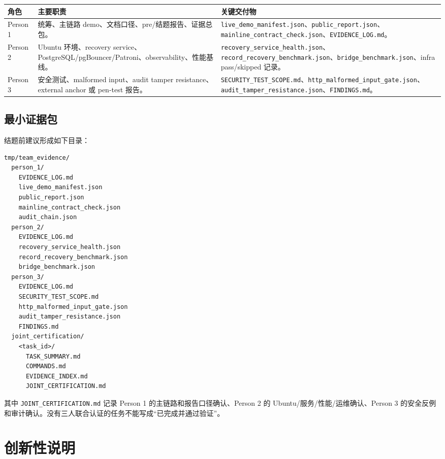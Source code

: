 \documentclass[UTF8,a4paper,12pt,oneside]{ctexrep}
\begin{document}
\begin{longtable}{p{}p{}p{}}
\toprule
\textbf{角色} & \textbf{主要职责} & \textbf{关键交付物} \\
\midrule
Person 1 & 统筹、主链路 demo、文档口径、pre/结题报告、证据总包。 & \texttt{live\_demo\_manifest.json}、\texttt{public\_report.json}、\texttt{mainline\_contract\_check.json}、\texttt{EVIDENCE\_LOG.md}。 \\
Person 2 & Ubuntu 环境、recovery service、PostgreSQL/pgBouncer/Patroni、observability、性能基线。 & \texttt{recovery\_service\_health.json}、\texttt{record\_recovery\_benchmark.json}、\texttt{bridge\_benchmark.json}、infra pass/skipped 记录。 \\
Person 3 & 安全测试、malformed input、audit tamper resistance、external anchor 或 pen-test 报告。 & \texttt{SECURITY\_TEST\_SCOPE.md}、\texttt{http\_malformed\_input\_gate.json}、\texttt{audit\_tamper\_resistance.json}、\texttt{FINDINGS.md}。 \\
\bottomrule
\end{longtable}

\section{最小证据包}

结题前建议形成如下目录：

\begin{lstlisting}
tmp/team_evidence/
  person_1/
    EVIDENCE_LOG.md
    live_demo_manifest.json
    public_report.json
    mainline_contract_check.json
    audit_chain.json
  person_2/
    EVIDENCE_LOG.md
    recovery_service_health.json
    record_recovery_benchmark.json
    bridge_benchmark.json
  person_3/
    EVIDENCE_LOG.md
    SECURITY_TEST_SCOPE.md
    http_malformed_input_gate.json
    audit_tamper_resistance.json
    FINDINGS.md
  joint_certification/
    <task_id>/
      TASK_SUMMARY.md
      COMMANDS.md
      EVIDENCE_INDEX.md
      JOINT_CERTIFICATION.md
\end{lstlisting}

其中 \texttt{JOINT\_CERTIFICATION.md} 记录 Person 1 的主链路和报告口径确认、Person 2 的 Ubuntu/服务/性能/运维确认、Person 3 的安全反例和审计确认。没有三人联合认证的任务不能写成“已完成并通过验证”。

\chapter{创新性说明}
\end{document}
